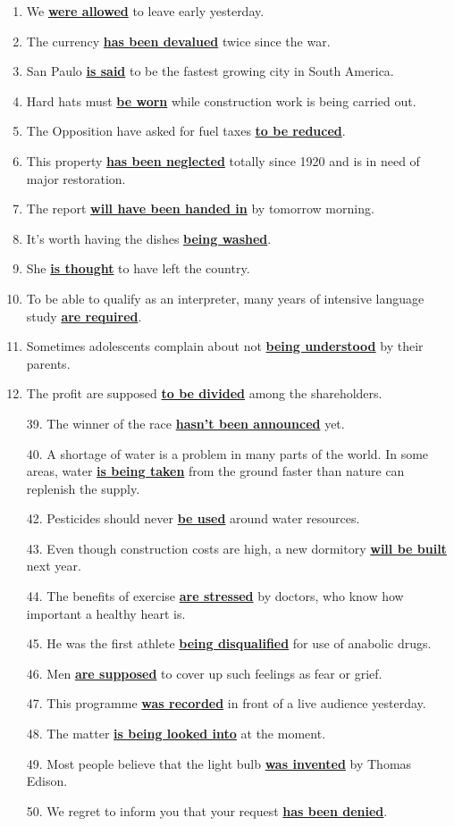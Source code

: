 \documentclass[main.tex]{subfiles}
\begin{document}
\begin{enumerate}[nosep,leftmargin=10mm]
	\itemsep\eitsp
	\setcounter{enumi}{25}
	\item We \uline{\textbf{were allowed}} to leave early yesterday.
	\item The currency \uline{\textbf{has been devalued}} twice since the war.
	\item San Paulo \uline{\textbf{is said}} to be the fastest growing city in South America.
	\item Hard hats must \uline{\textbf{be worn}} while construction work is being carried out.
	\item The Opposition have asked for fuel taxes \uline{\textbf{to be reduced}}.
	\item This property \uline{\textbf{has been neglected}} totally since 1920 and is in need of major restoration.
	\item The report \uline{\textbf{will have been handed in}} by tomorrow morning.
	\item It's worth having the dishes \uline{\textbf{being washed}}.
	\item She \uline{\textbf{is thought}} to have left the country.
	\item To be able to qualify as an interpreter, many years of intensive language study \uline{\textbf{are required}}.
	\item Sometimes adolescents complain about not \uline{\textbf{being understood}} by their parents.
	\item The profit are supposed \uline{\textbf{to be divided}} among the shareholders.
	\item[39.] The winner of the race \uline{\textbf{hasn't been announced}} yet.
	\item[40.] A shortage of water is a problem in many parts of the world.
In some areas, water \uline{\textbf{is being taken}} from the ground faster than nature can replenish the supply.
	\item[42.] Pesticides should never \uline{\textbf{be used}} around water resources.
	\item[43.] Even though construction costs are high, a new dormitory \uline{\textbf{will be built}} next year.
	\item[44.] The benefits of exercise \uline{\textbf{are stressed}} by doctors, who know how important a healthy heart is.
	\item[45.] He was the first athlete \uline{\textbf{being disqualified}} for use of anabolic drugs.
	\item[46.] Men \uline{\textbf{are supposed}} to cover up such feelings as fear or grief.
	\item[47.] This programme \uline{\textbf{was recorded}} in front of a live audience yesterday.
	\item[48.] The matter \uline{\textbf{is being looked into}} at the moment.
	\item[49.] Most people believe that the light bulb \uline{\textbf{was invented}} by Thomas Edison.
	\item[50.] We regret to inform you that your request \uline{\textbf{has been denied}}.
\end{enumerate}
\ 
\end{document}
